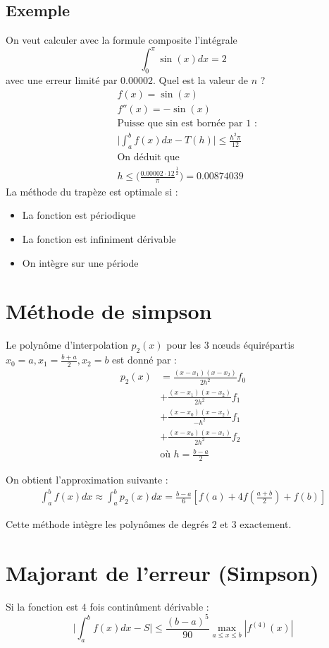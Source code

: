 \documentclass[a4paper,9pt]{extarticle}
\begin{document}
\begin{multicols*}{2}
\subsection*{Exemple}
On veut calculer avec la formule composite l'intégrale 
$$\int_0^\pi\sin(x)dx=2$$
avec une erreur limité par $0.00002$. Quel est la valeur de $n$ ?
\begin{align*}
& f(x)=\sin(x)\\
& f''(x)=-\sin(x)\\
& \text{Puisse que sin est bornée par 1 :}\\
& \Big|\int_a^bf(x)dx-T(h)\Big| \leq \frac{h^2\pi}{12}\\
& \text{On déduit que} \\
& h \leq \Big(\frac{0.00002\cdot12}{\pi}^{\frac{1}{2}}\Big)=0.00874039
\end{align*}
La méthode du trapèze est optimale si :
\begin{itemize}
    \item La fonction est périodique
    \item La fonction est infiniment dérivable
    \item On intègre sur une période
\end{itemize}

\section{Méthode de simpson}
Le polynôme d'interpolation $p_2(x)$ pour les 3 nœuds équirépartis $x_0=a,x_1=\frac{b+a}{2},x_2=b$ est donné par :
\begin{align*}
p_2(x)&=\frac{(x-x_1)(x-x_2)}{2h^2}f_0\\
&+\frac{(x-x_1)(x-x_2)}{2h^2}f_1\\
&+\frac{(x-x_0)(x-x_2)}{-h^2}f_1\\
&+\frac{(x-x_0)(x-x_1)}{2h^2}f_2\\
& \text{où } h=\frac{b-a}{2}
\end{align*}

On obtient l'approximation suivante :
\begin{align*}
\int_a^bf(x)dx \approx \int_a^bp_2(x)dx = \frac{b-a}{6}[f(a)+4f(\frac{a+b}{2})+f(b)]
\end{align*}

Cette méthode intègre les polynômes de degrés $2$ et $3$ exactement.

\section{Majorant de l'erreur (Simpson)}
Si la fonction est $4$ fois continûment dérivable :
$$
\Big|\int_a^bf(x)dx-S\Big| \leq \frac{(b-a)^5}{90}\max_{a\leq x\leq b}|f^{(4)}(x)|
$$


\end{multicols*}
\end{document}
